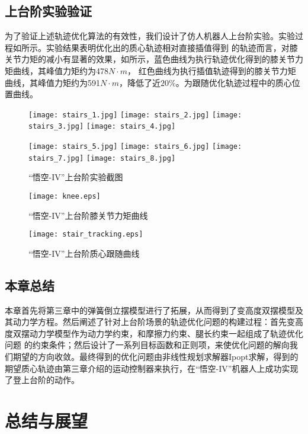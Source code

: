 \section{上台阶实验验证}
\label{stair_experiment}
为了验证上述轨迹优化算法的有效性，我们设计了仿人机器人上台阶实验。实验过程如所示。实验结果表明优化出的质心轨迹相对直接插值得到
的轨迹而言，对膝关节力矩的减小有显著的效果，如所示，蓝色曲线为执行轨迹优化得到的膝关节力矩曲线，其峰值力矩约为478$N\cdot m$，
红色曲线为执行插值轨迹得到的膝关节力矩曲线，其峰值力矩约为591$N\cdot m$，降低了近$20\%$。为跟随优化轨迹过程中的质心位置曲线。
\begin{figure}[htbp]
    \centering
    \texttt{[image: stairs\_1.jpg]}
    \texttt{[image: stairs\_2.jpg]}
    \texttt{[image: stairs\_3.jpg]}
    \texttt{[image: stairs\_4.jpg]}

    \texttt{[image: stairs\_5.jpg]}
    \texttt{[image: stairs\_6.jpg]}
    \texttt{[image: stairs\_7.jpg]}
    \texttt{[image: stairs\_8.jpg]}   
    \caption{\label{fig:track_exp}“悟空-IV”上台阶实验截图}
\end{figure}
\begin{figure}[htbp]
    \centering
    \texttt{[image: knee.eps]} 
    \caption{\label{fig:knee_torque}“悟空-IV”上台阶膝关节力矩曲线}
\end{figure}
\begin{figure}[htbp]
    \centering
    \texttt{[image: stair\_tracking.eps]} 
    \caption{\label{fig:track_com}“悟空-IV”上台阶质心跟随曲线}
\end{figure}
\section{本章总结}
本章首先将第三章中的弹簧倒立摆模型进行了拓展，从而得到了变高度双摆模型及其动力学方程。然后阐述了针对上台阶场景的轨迹优化问题的构建过程：首先变高度双摆动力学模型作为动力学约束，和摩擦力约束、腿长约束一起组成了轨迹优化问题
的约束条件；然后设计了一系列目标函数和正则项，来使优化问题的解向我们期望的方向收敛。最终得到的优化问题由非线性规划求解器Ipopt求解，得到的期望质心轨迹由第三章介绍的运动控制器来执行，在“悟空-IV”机器人上成功实现了登上台阶的动作。
\chapter{总结与展望}
